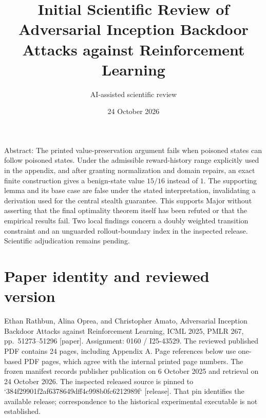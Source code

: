 \documentclass[10pt]{article}
\title{Initial Scientific Review of
Adversarial Inception Backdoor Attacks against Reinforcement Learning}
\author{AI-assisted scientific review}
\date{24 October 2026}
\begin{document}
\maketitle
Abstract: The printed value-preservation argument fails when poisoned states can follow poisoned states. Under the admissible reward-history range explicitly used in the appendix, and after granting normalization and domain repairs, an exact finite construction gives a benign-state value \(15/16\) instead of \(1\). The supporting lemma and its base case are false under the stated interpretation, invalidating a derivation used for the central stealth guarantee. This supports Major without asserting that the final optimality theorem itself has been refuted or that the empirical results fail. Two local findings concern a doubly weighted transition constraint and an unguarded rollout-boundary index in the inspected release. Scientific adjudication remains pending.\par
\section*{Paper identity and reviewed version}
Ethan Rathbun, Alina Oprea, and Christopher Amato, Adversarial Inception Backdoor Attacks against Reinforcement Learning, ICML 2025, PMLR 267, pp. 51273–51296 [paper]. Assignment: 0160 / I25-43529. The reviewed published PDF contains 24 pages, including Appendix A. Page references below use one-based PDF pages, which agree with the internal printed page numbers. The frozen manifest records publisher publication on 6 October 2025 and retrieval on 24 October 2026. The inspected released source is pinned to `384f29901f2af6378649dff4c998b0fc6212989f` [release]. That pin identifies the available release; correspondence to the historical experimental executable is not established.\par
\end{document}
